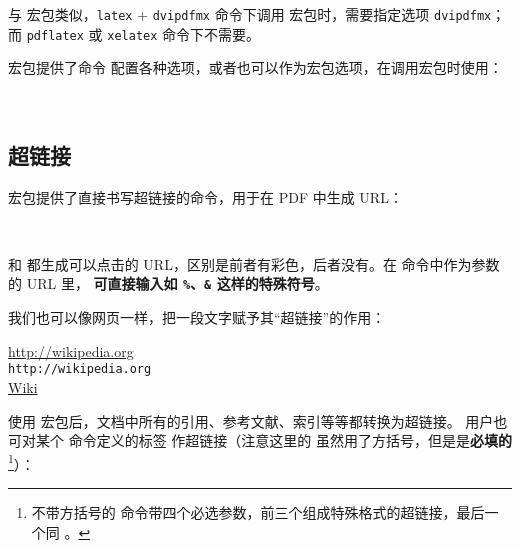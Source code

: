 与  宏包类似，\texttt{latex} + \texttt{dvipdfmx} 命令下调用  宏包时，需要指定选项 \texttt{dvipdfmx}；
而 \texttt{pdflatex} 或 \texttt{xelatex} 命令下不需要。

 宏包提供了命令  配置各种选项，或者也可以作为宏包选项，在调用宏包时使用：
\begin{command}
 \\
\end{command}

\subsection{超链接}\label{subsec:url-href}

 宏包提供了直接书写超链接的命令，用于在 PDF 中生成 URL：
\begin{command}
 \\
\end{command}

 和  都生成可以点击的 URL，区别是前者有彩色，后者没有。在  命令中作为参数的 URL 里，
\textbf{可直接输入如 \texttt\%、\texttt\& 这样的特殊符号}。

我们也可以像网页一样，把一段文字赋予其“超链接”的作用：
\begin{command}
\end{command}

\begin{example}
\url{http://wikipedia.org} \\
\nolinkurl{http://wikipedia.org} \\
\href{http://wikipedia.org}{Wiki}
\end{example}

使用  宏包后，文档中所有的引用、参考文献、索引等等都转换为超链接。
用户也可对某个  命令定义的标签  作超链接（注意这里的  虽然用了方括号，但是是\textbf{必填的}%
\footnote{不带方括号的  命令带四个必选参数，前三个组成特殊格式的超链接，最后一个同 。}）：
\begin{command}
\end{command}

